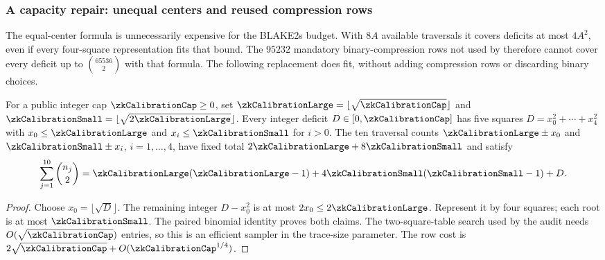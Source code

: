 \subsubsection{A capacity repair: unequal centers and reused compression rows}

The equal-center formula is unnecessarily expensive for the BLAKE2s budget. With $8A$ available traversals it covers deficits at most $4A^2$, even if every four-square representation fits that bound. The $95232$ mandatory binary-compression rows not used by  therefore cannot cover every deficit up to $\binom{65536}{2}$ with that formula. The following replacement does fit, without adding compression rows or discarding binary choices.

\begin{lemma}\label{lem:zk-unequal-centers}
For a public integer cap $\zkCalibrationCap\ge0$, set $\zkCalibrationLarge=\lfloor\sqrt{\zkCalibrationCap}\rfloor$ and $\zkCalibrationSmall=\lfloor\sqrt{2\zkCalibrationLarge}\rfloor$. Every integer deficit $D\in[0,\zkCalibrationCap]$ has five squares $D=x_0^2+\cdots+x_4^2$ with $x_0\le\zkCalibrationLarge$ and $x_i\le\zkCalibrationSmall$ for $i>0$. The ten traversal counts $\zkCalibrationLarge\pm x_0$ and $\zkCalibrationSmall\pm x_i$, $i=1,\ldots,4$, have fixed total $2\zkCalibrationLarge+8\zkCalibrationSmall$ and satisfy
\[
 \sum_{j=1}^{10}\binom{n_j}{2}
 =\zkCalibrationLarge(\zkCalibrationLarge-1)
   +4\zkCalibrationSmall(\zkCalibrationSmall-1)+D.
\]
\end{lemma}
\begin{proof}
Choose $x_0=\lfloor\sqrt D\rfloor$. The remaining integer $D-x_0^2$ is at most $2x_0\le2\zkCalibrationLarge$. Represent it by four squares; each root is at most $\zkCalibrationSmall$. The paired binomial identity proves both claims. The two-square-table search used by the audit needs $O(\sqrt{\zkCalibrationCap})$ entries, so this is an efficient sampler in the trace-size parameter. The row cost is $2\sqrt{\zkCalibrationCap}+O(\zkCalibrationCap^{1/4})$.
\end{proof}

